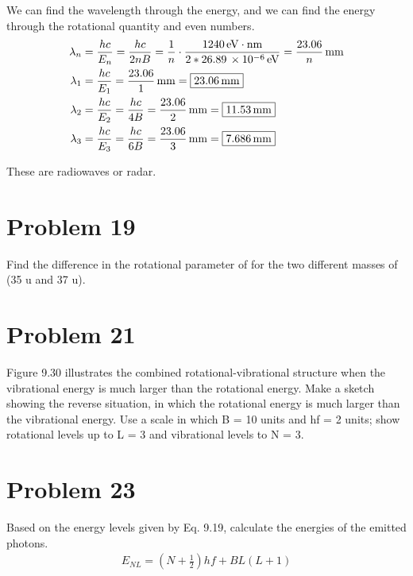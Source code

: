 \documentclass[12pt]{report}
\newcommand{\E}[1]{\times 10^{#1}}
\begin{document}
        We can find the wavelength through the energy, and we can find the energy through the rotational quantity and even numbers.
        \begin{align}
            \lambda_n   &=  \frac{hc}{E_n}
                =   \frac{hc}{2nB}
                =   \frac{1}{n} \cdot \frac{1240\,\unit{\eV\cdot\nano\meter}}{2*26.89\,\E{-6}\,\unit{\eV}}
                =   \frac{23.06}{n}\,\unit{\milli\meter}\\ \addtocounter{equation}{2}
            \lambda_1   &=  \frac{hc}{E_1}
                =   \frac{23.06}{1}\,\unit{\milli\meter}
                =   \boxed{23.06\,\unit{\milli\meter}}\\
            \lambda_2   &=  \frac{hc}{E_2}
                =   \frac{hc}{4B}
                =   \frac{23.06}{2}\,\unit{\milli\meter}
                =   \boxed{11.53\,\unit{\milli\meter}}\\ 
            \lambda_3   &=  \frac{hc}{E_3}
                =   \frac{hc}{6B}
                =   \frac{23.06}{3}\,\unit{\milli\meter}
                =   \boxed{7.686\,\unit{\milli\meter}}
        \end{align}

        These are radiowaves or radar.
    \pagebreak

\section{Problem 19}
    Find the difference in the rotational parameter  of  for the two different masses of  (35 u and 37 u).

\section{Problem 21} %
    Figure 9.30 illustrates the combined rotational-vibrational structure when the vibrational energy is much larger than the rotational energy. 
    Make a sketch showing the reverse situation, in which the rotational energy is much larger than the vibrational energy. 
    Use a scale in which B = 10 units and hf = 2 units; show rotational levels up to L = 3 and vibrational levels to N = 3.

\section{Problem 23}
    Based on the energy levels given by Eq. 9.19, calculate the energies of the emitted photons.
    \begin{gather}\tag{9.19}
        E_{NL} = (N + \frac{1}{2})hf + BL(L + 1)
    \end{gather}
\end{document}
